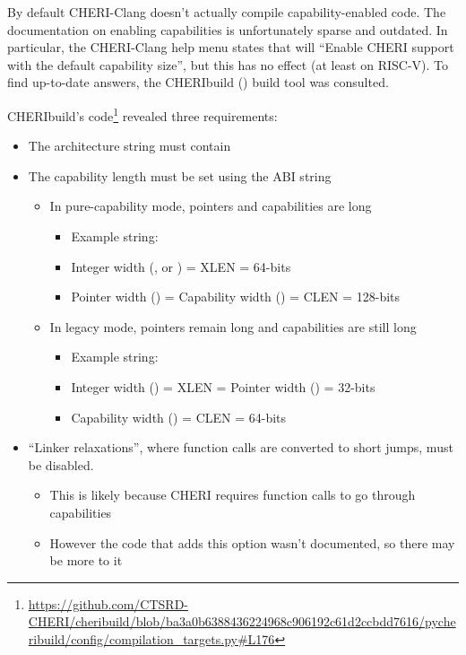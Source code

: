 By default CHERI-Clang doesn't actually compile capability-enabled code.
The documentation on enabling capabilities is unfortunately sparse and outdated.
In particular, the CHERI-Clang help menu states that  will \enquote{Enable CHERI support with the default capability size}, but this has no effect (at least on RISC-V).
To find up-to-date answers, the CHERIbuild () build tool was consulted.

CHERIbuild's code\footnote{\url{https://github.com/CTSRD-CHERI/cheribuild/blob/ba3a0b6388436224968c906192c61d2ccbdd7616/pycheribuild/config/compilation_targets.py\#L176}} revealed three requirements:
\begin{itemize}
    \item The architecture string must contain 
    \item The capability length must be set using the ABI string
    \begin{itemize}
        \item In pure-capability mode, pointers and capabilities are  long
        \begin{itemize}
            \item Example string: 
            \item Integer width (, or ) = XLEN = 64-bits
            \item Pointer width () = Capability width () = CLEN = 128-bits
        \end{itemize}
        \item In legacy mode, pointers remain  long and capabilities are still  long
        \begin{itemize}
            \item Example string: 
            \item Integer width () = XLEN = Pointer width () = 32-bits
            \item Capability width () = CLEN = 64-bits
        \end{itemize}
    \end{itemize}
    \item ``Linker relaxations'', where function calls are converted to short jumps\cite{chenCompilerSupportLinker2019}, must be disabled.
    \begin{itemize}
        \item This is likely because CHERI requires function calls to go through capabilities
        \item However the code that adds this option wasn't documented, so there may be more to it
    \end{itemize}
\end{itemize}

